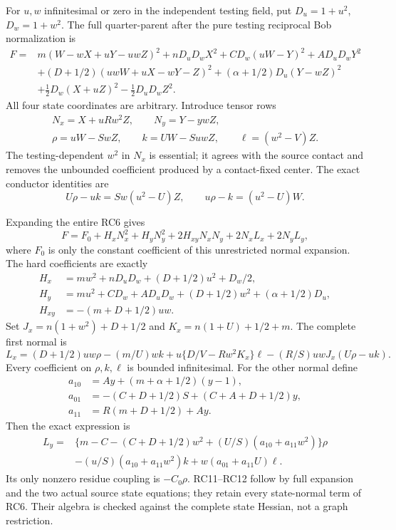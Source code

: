 For $u,w$ infinitesimal or zero in the independent testing field,
put $D_u=1+u^2$, $D_w=1+w^2$. The full quarter-parent after
the pure testing reciprocal Bob normalization is
\[
\begin{split}
 F={}&m(W-wX+uY-uwZ)^2+nD_uD_wX^2
       +CD_w(uW-Y)^2+AD_uD_wY^2\\
 &+(D+1/2)(uwW+uX-wY-Z)^2
       +(\alpha+1/2)D_u(Y-wZ)^2\\
 &+\tfrac12D_w(X+uZ)^2-\tfrac12D_uD_wZ^2.
\end{split}\tag{RC6}
\]
All four state coordinates are arbitrary. Introduce tensor rows
\[
 \begin{gathered}
 N_x=X+uRw^2Z,\qquad N_y=Y-ywZ,\\
 \rho=uW-SwZ,\qquad k=UW-SuwZ,\qquad \ell=(w^2-V)Z.
 \end{gathered}
 \tag{RC7}
\]
The testing-dependent $w^2$ in $N_x$ is essential; it agrees with
the source contact and removes the unbounded coefficient produced
by a contact-fixed center. The exact conductor identities are
\[
 U\rho-uk=Sw(u^2-U)Z,\qquad
 u\rho-k=(u^2-U)W.
 \tag{RC8}
\]

Expanding the entire RC6 gives
\[
 F=F_0+H_xN_x^2+H_yN_y^2+2H_{xy}N_xN_y
                         +2N_xL_x+2N_yL_y,
 \tag{RC9}
\]
where $F_0$ is only the constant coefficient of this unrestricted
normal expansion. The hard coefficients are exactly
\[
\begin{split}
 H_x&=mw^2+nD_uD_w+(D+1/2)u^2+D_w/2,\\
 H_y&=mu^2+CD_w+AD_uD_w+(D+1/2)w^2+(\alpha+1/2)D_u,\\
 H_{xy}&=-(m+D+1/2)uw.
\end{split}\tag{RC10}
\]
Set $J_x=n(1+w^2)+D+1/2$ and $K_x=n(1+U)+1/2+m$.
The complete first normal is
\[
 L_x=(D+1/2)uw\rho-(m/U)wk
 +u\{D/V-Rw^2K_x\}\ell
 -(R/S)uwJ_x(U\rho-uk).
 \tag{RC11}
\]
Every coefficient on $\rho,k,\ell$ is bounded infinitesimal.
For the other normal define
\[
 \begin{aligned}
 a_{10}&=Ay+(m+\alpha+1/2)(y-1),\\
 a_{01}&=-(C+D+1/2)S+(C+A+D+1/2)y,\\
 a_{11}&=R(m+D+1/2)+Ay.
 \end{aligned}
\]
Then the exact expression is
\[
\begin{split}
 L_y={}&\{m-C-(C+D+1/2)w^2+(U/S)(a_{10}+a_{11}w^2)\}\rho\\
 &-(u/S)(a_{10}+a_{11}w^2)k+w(a_{01}+a_{11}U)\ell.
\end{split}\tag{RC12}
\]
Its only nonzero residue coupling is $-C_0\rho$. RC11--RC12
follow by full expansion and the two actual source state equations;
they retain every state-normal term of RC6. Their algebra is
checked against the complete state Hessian, not a graph restriction.

